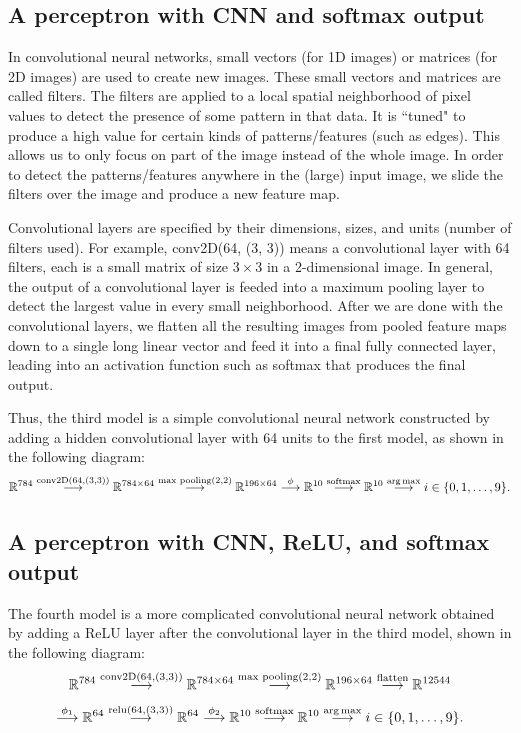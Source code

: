 \documentclass{article}
\begin{document}
\subsection{A perceptron with CNN and softmax output} In convolutional neural networks, small vectors (for 1D images) or matrices (for 2D images) are used to create new images. These small vectors and matrices are called filters. The filters are applied to a local spatial neighborhood of pixel values to detect the presence of some pattern in that data. It is ``tuned" to produce a high value for certain kinds of patterns/features (such as edges). This allows us to only focus on part of the image instead of the whole image. In order to detect the patterns/features anywhere in the (large) input image, we slide the filters over the image and produce a new feature map.

Convolutional layers are specified by their dimensions, sizes, and units (number of filters used). For example, conv2D(64, (3, 3)) means a convolutional layer with 64 filters, each is a small matrix of size $3\times 3$ in a 2-dimensional image. In general, the output of a convolutional layer is feeded into a maximum pooling layer to detect the largest value in every small neighborhood. After we are done with the convolutional layers, we flatten all the resulting images from pooled feature maps down to a single long linear vector and feed it into a final fully connected layer, leading into an activation function such as softmax that produces the final output.

Thus, the third model is a simple convolutional neural network constructed by adding a hidden convolutional layer with 64 units to the first model, as shown in the following diagram:
$$
\mathbb{R}^{784} \stackrel{{\rm conv2D}(64, (3, 3))}{\longrightarrow}\mathbb{R}^{784\times 64} \stackrel{\rm max \,\, pooling (2, 2)}{\longrightarrow} \mathbb{R}^{196\times 64} \stackrel{\,\,\phi\,\,}{\longrightarrow} \mathbb{R}^{10} \stackrel{\rm softmax}{\longrightarrow}\mathbb{R}^{10}\stackrel{\rm arg\,max}{\longrightarrow} i\in \{0, 1, \ldots, 9\}.
$$

\subsection{A perceptron with CNN, ReLU, and softmax output}
The fourth model is a more complicated convolutional neural network obtained by adding a ReLU layer after the convolutional layer in the third model, shown in the following diagram:
$$
\mathbb{R}^{784} \stackrel{{\rm conv2D}(64, (3, 3))}{\longrightarrow} \mathbb{R}^{784\times 64}\stackrel{\rm max\,\, pooling (2, 2)}{\longrightarrow} \mathbb{R}^{196\times 64}\stackrel{{\rm flatten}}{\longrightarrow} \mathbb{R}^{12544}
$$
$$\stackrel{\,\,\phi_1\,\,}{\longrightarrow} \mathbb{R}^{64}\stackrel{{\rm relu}(64, (3, 3))}{\longrightarrow} \mathbb{R}^{64}\stackrel{\,\,\phi_2\,\,}{\longrightarrow} \mathbb{R}^{10} \stackrel{\rm softmax}{\longrightarrow}\mathbb{R}^{10}\stackrel{\rm arg\,max}{\longrightarrow} i\in \{0, 1, \ldots, 9\}.
$$
\end{document}
